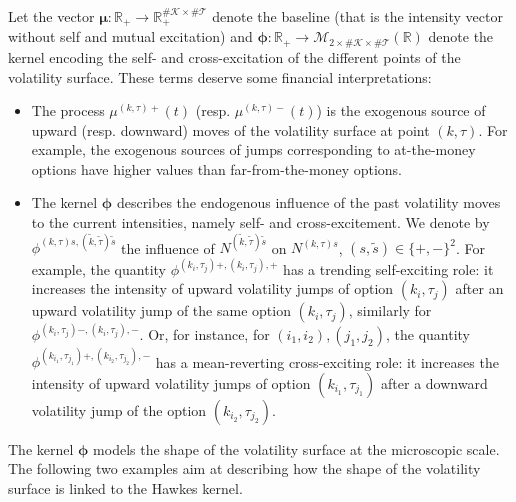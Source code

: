 \documentclass[12pt]{article}
\begin{document}
Let the vector $\boldsymbol{\mu}: \mathbb{R}_+ \to \mathbb{R}_+^{\#\mathcal{K}\times\#\mathcal{T}}$ denote the baseline (that is the intensity vector without self and mutual excitation) and $\boldsymbol{\phi}: \mathbb{R}_+ \to \mathcal{M}_{2\times\#\mathcal{K}\times\#\mathcal{T}}(\mathbb{R})$ denote the kernel encoding the self- and cross-excitation of the different points of the volatility surface. These terms deserve some financial interpretations:
\begin{itemize}
    \item The process $\mu^{(k,\tau)+}(t)$ (resp. $\mu^{(k,\tau)-}(t)$) is the exogenous source of upward (resp. downward) moves of the volatility surface at point $(k,\tau)$.  For example, the exogenous sources of jumps corresponding to at-the-money options have higher values than far-from-the-money options. 
    \item The kernel $\boldsymbol{\phi}$ describes the endogenous influence of the past volatility moves to the current intensities, namely self- and cross-excitement. We denote by $\phi^{(k,\tau)s,(\tilde k,\tilde \tau)\tilde{s}}$ the influence of $N^{(\tilde k,\tilde \tau)\tilde{s}}$ on $N^{(k,\tau)s}$, $(s, \tilde s)\in \{+,-\}^2$. For example, the quantity $\phi^{(k_i,\tau_j)+,(k_i,\tau_j),+}$ has a trending self-exciting role: it increases the intensity of upward volatility jumps of option $(k_i,\tau_j)$ after an upward volatility jump of the same option $(k_i,\tau_j)$, similarly for $\phi^{(k_i,\tau_j)-,(k_i,\tau_j),-}$. Or, for instance, for $(i_1,i_2),(j_1,j_2)$, the quantity  $\phi^{(k_{i_1},\tau_{j_1})+,(k_{i_2},\tau_{j_2}),-}$ has a mean-reverting cross-exciting role: it increases the intensity of upward volatility jumps of option $(k_{i_1},\tau_{j_1})$ after a downward volatility jump of the option $(k_{i_2},\tau_{j_2})$. 
\end{itemize}
The kernel $\boldsymbol{\phi}$ models the shape of the volatility surface at the microscopic scale. The following two examples aim at describing how the shape of the volatility surface is linked to the Hawkes kernel. 
\end{document}
